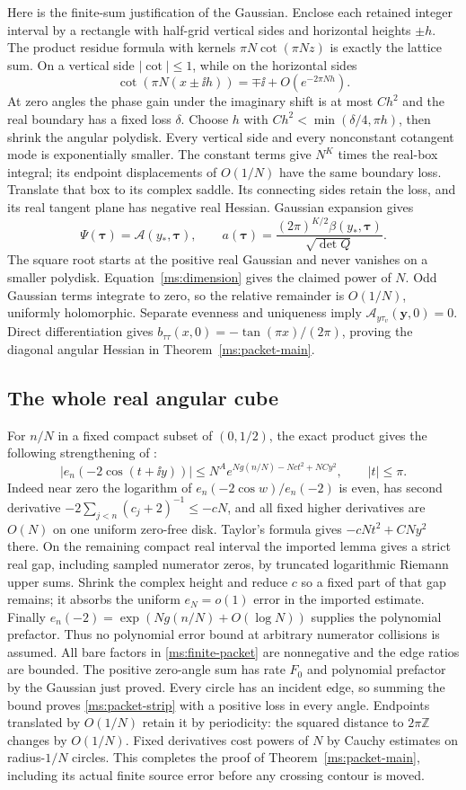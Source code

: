 Here is the finite-sum justification of the Gaussian. Enclose each
retained integer interval by a rectangle with half-grid vertical
sides and horizontal heights $\pm h$. The product residue formula
with kernels $\pi N\cot(\pi Nz)$ is exactly the lattice sum.
On a vertical side $|\cot|\le1$, while on the horizontal sides
\[
 \cot(\pi N(x\pm\ii h))=\mp\ii+O(e^{-2\pi Nh}).
\]
At zero angles the phase gain under the imaginary shift is at
most $C h^2$ and the real boundary has a fixed loss $\delta$.
Choose $h$ with $C h^2<\min(\delta/4,\pi h)$, then shrink the
angular polydisk. Every vertical side and every nonconstant
cotangent mode is exponentially smaller. The constant terms give
$N^K$ times the real-box integral; its endpoint displacements of
$O(1/N)$ have the same boundary loss. Translate that box to its
complex saddle. Its connecting sides retain the loss, and its real
tangent plane has negative real Hessian. Gaussian expansion gives
\[
 \Psi(\boldsymbol\tau)=\mathcal A(y_*,\boldsymbol\tau),\qquad
 a(\boldsymbol\tau)=
 \frac{(2\pi)^{K/2}\beta(y_*,\boldsymbol\tau)}{\sqrt{\det Q}}.
\]
The square root starts at the positive real Gaussian and never
vanishes on a smaller polydisk. Equation~\eqref{ms:dimension}
gives the claimed power of $N$. Odd Gaussian terms integrate to
zero, so the relative remainder is $O(1/N)$, uniformly holomorphic.
Separate evenness and uniqueness imply
$\mathcal A_{y\tau_v}(\mathbf y,0)=0$. Direct differentiation
gives $b_{\tau\tau}(x,0)=-\tan(\pi x)/(2\pi)$, proving the
diagonal angular Hessian in Theorem~\ref{ms:packet-main}.

\subsection{The whole real angular cube}
For $n/N$ in a fixed compact subset of $(0,1/2)$, the exact product
gives the following strengthening of \cite[Lemma 7.2]{Bounds}:
\[
 |e_n(-2\cos(t+\ii y))|
 \le N^A e^{Ng(n/N)-Nct^2+NCy^2},\qquad |t|\le\pi.
\]
Indeed near zero the logarithm of
$e_n(-2\cos w)/e_n(-2)$ is even, has second derivative
$-2\sum_{j<n}(c_j+2)^{-1}\le-cN$, and all fixed higher
derivatives are $O(N)$ on one uniform zero-free disk. Taylor's
formula gives $-cNt^2+CNy^2$ there. On the remaining compact
real interval the imported lemma gives a strict real gap, including
sampled numerator zeros, by truncated logarithmic Riemann upper
sums. Shrink the complex height and reduce $c$ so a fixed part of
that gap remains; it absorbs the uniform $e_N=o(1)$ error in
the imported estimate. Finally
$e_n(-2)=\exp(Ng(n/N)+O(\log N))$ supplies the polynomial
prefactor. Thus no polynomial error bound at arbitrary numerator
collisions is assumed. All bare factors in
\eqref{ms:finite-packet} are nonnegative and the edge ratios are
bounded. The positive zero-angle sum has rate $F_0$ and polynomial
prefactor by the Gaussian just proved. Every circle has an incident
edge, so summing the bound proves \eqref{ms:packet-strip} with a
positive loss in every angle. Endpoints translated by $O(1/N)$
retain it by periodicity: the squared distance to $2\pi\mathbb Z$
changes by $O(1/N)$. Fixed derivatives cost powers of $N$ by Cauchy
estimates on radius-$1/N$ circles. This completes the proof of
Theorem~\ref{ms:packet-main}, including its actual finite source
error before any crossing contour is moved.
